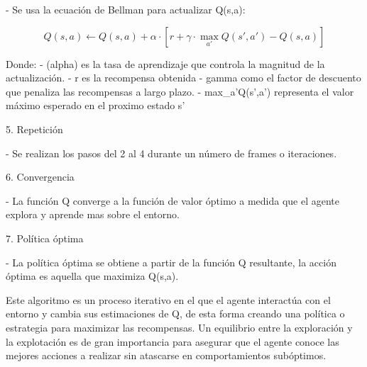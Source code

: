 	- Se usa la ecuación de Bellman para actualizar Q(s,a):
		
		\begin{equation}
		Q(s, a) \leftarrow Q(s, a) + \alpha \cdot \left[ r + \gamma \cdot \max_{a'} 		Q(s', a') - Q(s, a) \right]
		\end{equation}

		Donde:
			- (alpha) es la tasa de aprendizaje que controla la magnitud de la 			actualización.
			- r es la recompensa obtenida
			- gamma como el factor de descuento que penaliza las recompensas a 			largo plazo.
			- max_a'Q(s',a') representa el valor máximo esperado en el proximo 			estado s'

5. Repetición

	- Se realizan los pasos del 2 al 4 durante un número de frames o iteraciones.

6. Convergencia
	
	- La función Q converge a la función de valor óptimo a medida que el agente explora 	y aprende mas sobre el entorno.

7. Política óptima

	- La política óptima se obtiene a partir de la función Q resultante, la acción 	óptima es aquella que maximiza Q(s,a).

Este algoritmo es un proceso iterativo en el que el agente interactúa con el entorno y cambia sus estimaciones de Q, de esta forma creando una política o estrategia para maximizar las recompensas. Un equilibrio entre la exploración y la explotación es de gran importancia para asegurar que el agente conoce las mejores acciones a realizar sin atascarse en comportamientos subóptimos.